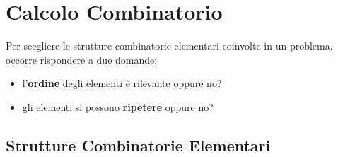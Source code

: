 \chapter{Calcolo Combinatorio}
Per scegliere le strutture combinatorie elementari coinvolte in un problema, occorre rispondere a due domande:
\begin{itemize}[nosep]
    \item l'\textbf{ordine} degli elementi è rilevante oppure no?
    \item gli elementi si possono \textbf{ripetere} oppure no?
\end{itemize}

\section{Strutture Combinatorie Elementari}
